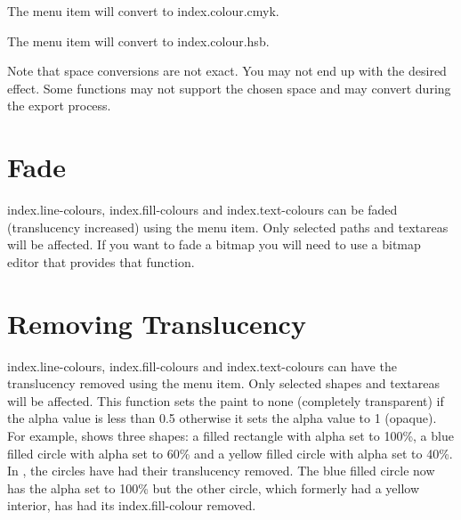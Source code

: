 
The  menu item will convert to
\gls{index.colour.cmyk}.


The  menu item will convert to
\gls{index.colour.hsb}.

\begin{warning}
Note that  space conversions are not exact. You may
not end up with the desired effect. Some  functions
may not support the chosen  space and may convert
during the export process.
\end{warning}


\section{Fade}\label{sec:fade}


\Glspl{index.line-colour}, \glspl{index.fill-colour} and
\glspl{index.text-colour} can be faded (\gls{translucency} increased)
using the  menu item. Only selected
\glspl{path} and \glspl{textarea} will be affected. If you want to
fade a \gls{bitmap} you will need to use a bitmap editor that
provides that function.


\section{Removing Translucency}\label{sec:removetrans}


\Glspl{index.line-colour}, \glspl{index.fill-colour} and
\glspl{index.text-colour} can have the \gls{translucency} removed using
the  menu item. Only selected
\glspl{shape} and \glspl{textarea} will be affected. This function
sets the paint to none (completely \gls{transparent}) if the alpha value
is less than 0.5 otherwise it sets the alpha value to 1 (opaque).
For example,  shows three shapes: a
filled rectangle with alpha set to 100\%, a blue filled circle with
alpha set to 60\% and a yellow filled circle with alpha set to 40\%.
In , the circles have had their
translucency removed. The blue filled circle now has the alpha set
to 100\% but the other circle, which formerly had a yellow interior,
has had its \gls{index.fill-colour} removed.

